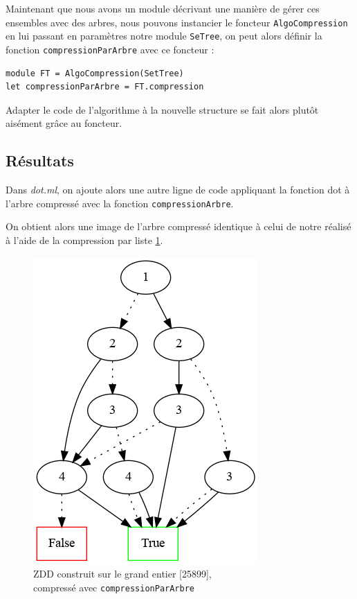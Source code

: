 \documentclass[12pt,a4paper]{article}
\begin{document}
Maintenant que nous avons un module décrivant une manière de gérer ces ensembles avec des arbres, nous pouvons instancier le foncteur \texttt{AlgoCompression} en lui passant en paramètres notre module \texttt{SeTree}, on peut alors définir la fonction \texttt{compressionParArbre} avec ce foncteur : 

\begin{lstlisting}
module FT = AlgoCompression(SetTree)
let compressionParArbre = FT.compression

\end{lstlisting}

Adapter le code de l'algorithme à la nouvelle structure se fait alors plutôt aisément grâce au foncteur.


\subsection{Résultats}

Dans \textit{dot.ml}, on ajoute alors une autre ligne de code appliquant la fonction dot à l'arbre compressé avec la fonction \texttt{compressionArbre}.

On obtient alors une image de l'arbre compressé identique à celui de notre réalisé à l'aide de la compression par liste \ref{fig3}.

\begin{figure}[hbtp]
\centering
\includegraphics[scale=0.3]{../Images/arbre_compresse_par_arbre.png}
\caption{ZDD construit sur le grand entier [25899],\\ compressé avec \texttt{compressionParArbre}}
\label{fig3}
\end{figure}
\end{document}
